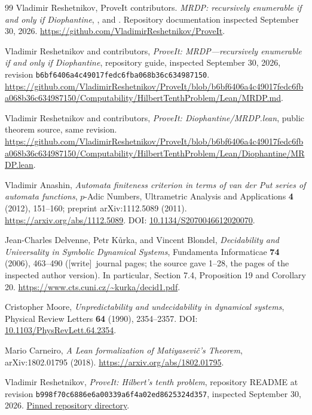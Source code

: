 \documentclass[11pt,letterpaper]{article}
\numberwithin{equation}{section}
\theoremstyle{definition}
\theoremstyle{remark}
\newcommand{\wtag}{\textup{[write]}}
\newcommand{\repourl}{\url{https://github.com/VladimirReshetnikov/ProveIt}}
\begin{document}
\begin{thebibliography}{99}
Vladimir Reshetnikov, ProveIt contributors.
\emph{MRDP: recursively enumerable if and only if Diophantine},
, and
.
Repository documentation inspected September 30, 2026.
\repourl.

Vladimir Reshetnikov and contributors,
\emph{ProveIt: MRDP---recursively enumerable if and only if Diophantine},
repository guide, inspected September 30, 2026, revision
\texttt{b6bf6406a4c49017fedc6fba068b36c634987150}.
\url{https://github.com/VladimirReshetnikov/ProveIt/blob/b6bf6406a4c49017fedc6fba068b36c634987150/Computability/HilbertTenthProblem/Lean/MRDP.md}.

Vladimir Reshetnikov and contributors,
\emph{ProveIt: Diophantine/MRDP.lean}, public theorem source, same revision.
\url{https://github.com/VladimirReshetnikov/ProveIt/blob/b6bf6406a4c49017fedc6fba068b36c634987150/Computability/HilbertTenthProblem/Lean/Diophantine/MRDP.lean}.

Vladimir Anashin,
\emph{Automata finiteness criterion in terms of van der Put series of
automata functions},
$p$-Adic Numbers, Ultrametric Analysis and Applications \textbf{4} (2012),
151--160; preprint arXiv:1112.5089 (2011).
\url{https://arxiv.org/abs/1112.5089}.
DOI: \href{https://doi.org/10.1134/S2070046612020070}{10.1134/S2070046612020070}.

Jean-Charles Delvenne, Petr K\r{u}rka, and Vincent Blondel,
\emph{Decidability and Universality in Symbolic Dynamical Systems},
Fundamenta Informaticae \textbf{74} (2006), 463--490 (\wtag\ journal pages; the source gave 1--28, the pages of the inspected author
version). In particular, Section 7.4, Proposition 19 and Corollary 20.
\url{https://www.cts.cuni.cz/~kurka/decid1.pdf}.

Cristopher Moore,
\emph{Unpredictability and undecidability in dynamical systems},
Physical Review Letters \textbf{64} (1990), 2354--2357.
DOI: \href{https://doi.org/10.1103/PhysRevLett.64.2354}{10.1103/PhysRevLett.64.2354}.

Mario Carneiro,
\emph{A Lean formalization of Matiyasevi\v{c}'s Theorem},
arXiv:1802.01795 (2018).
\url{https://arxiv.org/abs/1802.01795}.

Vladimir Reshetnikov, \emph{ProveIt: Hilbert's tenth problem}, repository
README at revision \texttt{b998f70c6886e6a00339a6f4a02ed8625324d357},
inspected September 30, 2026.
\href{https://github.com/VladimirReshetnikov/ProveIt/tree/b998f70c6886e6a00339a6f4a02ed8625324d357/Computability/HilbertTenthProblem}{Pinned repository directory}.


\end{thebibliography}
\end{document}
